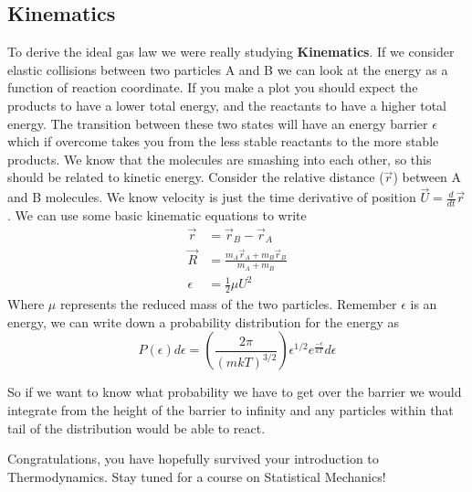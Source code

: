 \documentclass{article}
\begin{document}
\subsection*{Kinematics}
To derive the ideal gas law we were really studying \textbf{Kinematics}. 
If we consider elastic collisions between two particles A and B we can look at the energy as a function of reaction coordinate. 
If you make a plot you should expect the products to have a lower total energy, and the reactants to have a higher total energy. 
The transition between these two states will have an energy barrier $\epsilon$ which if overcome takes you from the less stable reactants to the more stable products. 
We know that the molecules are smashing into each other, so this should be related to kinetic energy. 
Consider the relative distance ($\vec{r}$) between A and B molecules. 
We know velocity is just the time derivative of position $\vec{U} = \frac{d}{dt}\vec{r}$. 
We can use some basic kinematic equations to write 
\begin{equation}
\begin{split}
    \vec{r} &= \vec{r}_B - \vec{r}_A\\
    \vec{R} &= \frac{m_A\vec{r}_A + m_B\vec{r}_B}{m_A + m_B}\\
    \epsilon &= \frac{1}{2}\mu U^2
\end{split}
\end{equation}
Where $\mu$ represents the reduced mass of the two particles. 
Remember $\epsilon$ is an energy, we can write down a probability distribution for the energy as 
\begin{equation}
P(\epsilon)d\epsilon = \left(\frac{2\pi}{(mkT)^{3/2}}\right) \epsilon^{1/2} e^{\frac{-\epsilon}{kT}}d\epsilon
\end{equation}

So if we want to know what probability we have to get over the barrier we would integrate from the height of the barrier to infinity and any particles within that tail of the distribution would be able to react. 

Congratulations, you have hopefully survived your introduction to Thermodynamics. 
Stay tuned for a course on Statistical Mechanics!
\end{document}
